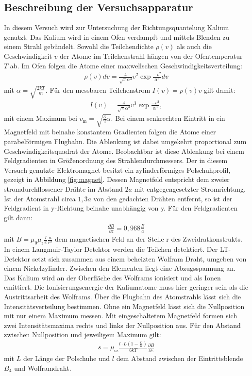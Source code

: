 \subsection{Beschreibung der Versuchsapparatur}
In diesem Versuch wird zur Untersuchung der Richtungsquantelung Kalium genutzt.
Das Kalium wird in einem Ofen verdampft und mittels Blenden zu einem Strahl gebündelt.
Sowohl die Teilchendichte $\rho(v)$ als auch die Geschwindigkeit $v$ der Atome im Teilchenstrahl
hängen von der Ofentemperatur $T$ ab. Im Ofen folgen die Atome einer
maxwellschen Geschwindigkeitsverteilung:
\begin{align}
  \rho(v)dv=\frac{4}{\sqrt{\pi}\alpha^3}v^2 \exp{\frac{-v^2}{\alpha^3}}dv
\end{align}
mit $\alpha=\sqrt{\frac{2kT}{m}}$.
Für den messbaren Teilchenstrom $I(v)=\rho(v)v$ gilt damit:
\begin{align}
 I(v)=\frac{4}{\sqrt{\pi}\alpha^3}v^3 \exp{\frac{-v^2}{\alpha^3}}\label{eqn:teilchenstrom},
\end{align}
mit einem Maximum bei $v_\mathrm{m}=\sqrt{\frac{3}{2}\alpha}$.
Bei einem senkrechten Eintritt in ein Magnetfeld mit beinahe konstantem Gradienten folgen
die Atome einer parabelförmigen Flugbahn. Die Ablenkung ist dabei umgekehrt proportional
zum Geschwindigkeitsquadrat der Atome.
Beobachtbar ist diese Ablenkung bei einem Feldgradienten
in Größenordnung des Strahlendurchmessers.
Der in diesem Versuch genutzte Elektromagnet besitzt ein zylinderförmiges
Polschuhprofil, gezeigt in Abbildung \ref{fig:magnet}.
Dessen Magnetfeld entspricht dem zweier stromdurchflossener Drähte im Abstand $2a$
mit entgegengesetzter Stromrichtung.
Ist der Atomstrahl circa $1,3a$ von den gedachten Drähten entfernt, so ist
der Feldgradient in y-Richtung beinahe unabhängig von y.
Für den Feldgradienten gilt dann:
\begin{align}
  \frac{\partial B}{\partial z}=0,968\frac{B}{a}
\end{align}
mit $B=\mu_\mathrm{0}\mu_\mathrm{r}\frac{I}{\pi}\frac{a}{r^2}$ dem magnetischen
Feld an der Stelle r des Zweidratkonstrukts.
In einem Langmuir-Taylor Detektor werden die Teilchen detektiert.
Der LT-Detektor setzt sich zusammen aus einem beheizten Wolfram Draht, umgeben
von einem Nickelzylinder. Zwischen den Elementen liegt eine Abzugsspannung an.
Das Kalium wird an der Oberfläche des Wolframs
ionisiert und als Ionen emittiert. Die Ionisierungsenergie der Kaliumatome
muss hier geringer sein als die Austrittsarbeit des Wolframs.
Über die Flugbahn des Atomstrahls lässt sich die Intensitätsverteilung
bestimmen. Ohne ein Magnetfeld lässt sich die Nullposition mit nur einem
Maximum messen. Mit eingeschaltetem Magnetfeld formen sich zwei Intensitätsmaxima
rechts und links der Nullposition aus.
Für den Abstand zwischen Nullposition und jeweiligem Maximum gilt:
\begin{align}
  s=\mu_\mathrm{sz}\frac{l\cdot L(1-\frac{L}{2l})}{6kT}\frac{\partial B}{\partial z} \label{eqn:abstand}
\end{align}
mit $L$ der Länge der Polschuhe und $l$ dem Abstand zwischen
der Eintrittsblende $B_\mathrm{4}$ und Wolframdraht.
